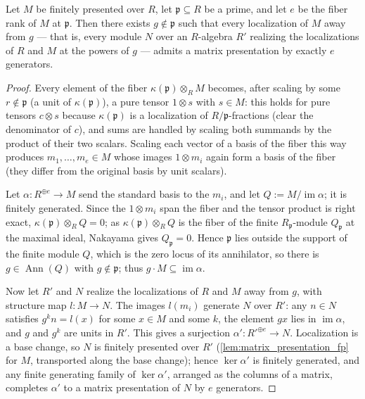 \begin{theorem}
  \label{thm:nakayama_prolongation}
  \leanok
  Let \(M\) be finitely presented over \(R\), let \(\mathfrak p \subseteq R\)
  be a prime, and let \(e\) be the fiber rank of \(M\) at \(\mathfrak p\).
  Then there exists \(g \notin \mathfrak p\) such that every localization of
  \(M\) away from \(g\) --- that is, every module \(N\) over an \(R\)-algebra
  \(R'\) realizing the localizations of \(R\) and \(M\) at the powers of
  \(g\) --- admits a matrix presentation by exactly \(e\) generators.
\end{theorem}

\begin{proof}
  \leanok
  Every element of the fiber \(\kappa(\mathfrak p) \otimes_R M\) becomes,
  after scaling by some \(r \notin \mathfrak p\) (a unit of
  \(\kappa(\mathfrak p)\)), a pure tensor \(1 \otimes s\) with \(s \in M\):
  this holds for pure tensors \(c \otimes s\) because
  \(\kappa(\mathfrak p)\) is a localization of \(R/\mathfrak p\)-fractions
  (clear the denominator of \(c\)), and sums are handled by scaling both
  summands by the product of their two scalars.  Scaling each vector of a
  basis of the fiber this way produces \(m_1, \dots, m_e \in M\) whose
  images \(1 \otimes m_i\) again form a basis of the fiber (they differ from
  the original basis by unit scalars).

  Let \(\alpha : R^{\oplus e} \to M\) send the standard basis to the
  \(m_i\), and let \(Q := M / \operatorname{im} \alpha\); it is finitely
  generated.  Since the \(1 \otimes m_i\) span the fiber and the tensor
  product is right exact, \(\kappa(\mathfrak p) \otimes_R Q = 0\); as
  \(\kappa(\mathfrak p) \otimes_R Q\) is the fiber of the finite
  \(R_{\mathfrak p}\)-module \(Q_{\mathfrak p}\) at the maximal ideal,
  Nakayama gives \(Q_{\mathfrak p} = 0\).  Hence \(\mathfrak p\) lies
  outside the support of the finite module \(Q\), which is the zero locus
  of its annihilator, so there is \(g \in \operatorname{Ann}(Q)\) with
  \(g \notin \mathfrak p\); thus \(g \cdot M \subseteq
  \operatorname{im} \alpha\).

  Now let \(R'\) and \(N\) realize the localizations of \(R\) and \(M\)
  away from \(g\), with structure map \(l : M \to N\).  The images
  \(l(m_i)\) generate \(N\) over \(R'\): any \(n \in N\) satisfies
  \(g^k n = l(x)\) for some \(x \in M\) and some \(k\), the element
  \(g x\) lies in \(\operatorname{im} \alpha\), and \(g\) and \(g^k\) are
  units in \(R'\).  This gives a surjection
  \(\alpha' : R'^{\oplus e} \to N\).  Localization is a base change, so
  \(N\) is finitely presented over \(R'\)
  (\cref{lem:matrix_presentation_fp} for \(M\), transported along the base
  change); hence \(\ker \alpha'\) is finitely generated, and any finite
  generating family of \(\ker \alpha'\), arranged as the columns of a
  matrix, completes \(\alpha'\) to a matrix presentation of \(N\) by \(e\)
  generators.
\end{proof}

